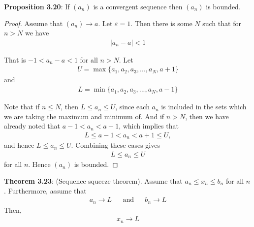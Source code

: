 \documentclass{article}
\begin{document}
\textbf{Proposition 3.20}: If $(a_n)$ is a convergent sequence then $(a_n)$ is bounded.
\begin{proof}
	Assume that $(a_n) \rightarrow a$. Let $\varepsilon = 1$. Then there is some $N$ such that for $n > N$ we have
	\begin{align*}
		|a_n - a| < 1
	\end{align*}

	That is $-1 < a_n - a < 1$ for all $n > N$. Let
	\begin{align*}
		U = \max\{a_1, a_2, a_3, ..., a_N, a + 1\}
	\end{align*}
	and
	\begin{align*}
		L = \min\{a_1, a_2, a_3, ..., a_N, a - 1\}
	\end{align*}

	Note that if $n \le N$, then $L \le a_n \le U$, since each $a_n$ is included in the sets which we are taking the maximum
	and minimum of. And if $n > N$, then we have already noted that $a - 1 < a_n < a + 1$, which implies that
	\begin{align*}
		L \le a - 1 < a_n < a + 1 \le U,
	\end{align*}
	and hence $L \le a_n \le U$. Combining these cases gives
	\begin{align*}
		L \le a_n \le U
	\end{align*}
	for all $n$. Hence $(a_n)$ is bounded.
\end{proof}

\textbf{Theorem 3.23}: (Sequence squeeze theorem). Assume that $a_n \le x_n \le b_n$ for all $n$. Furthermore, assume that
\begin{align*}
	a_n \rightarrow L &  & \text{and} &  & b_n \rightarrow L
\end{align*}
Then,
\begin{align*}
	x_n \rightarrow L
\end{align*}
\end{document}
